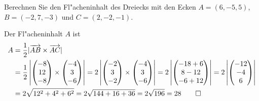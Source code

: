 Berechnen Sie den Fl"acheninhalt des Dreiecks mit den Ecken $A=(6,-5,5)$,
$B=(-2,7,-3)$ und $C=(2,-2,-1)$.

\begin{loesung}
Der Fl"acheninhalt $A$ ist
\begin{align*}
A&=\frac12|\overrightarrow{AB}\times\overrightarrow{AC}|\\
&=
\frac12\left|
\begin{pmatrix}-8\\12\\-8\end{pmatrix}
\times
\begin{pmatrix}-4\\3\\-6\end{pmatrix}
\right|
=
2\left|
\begin{pmatrix}-2\\3\\-2\end{pmatrix}
\times
\begin{pmatrix}-4\\3\\-6\end{pmatrix}
\right|
=
2\left|
\begin{pmatrix}
-18+6\\8-12\\-6+12
\end{pmatrix}
\right|
=
2\left|
\begin{pmatrix}
-12\\-4\\6
\end{pmatrix}
\right|
\\
&=
2\sqrt{12^2+4^2+6^2}
=
2\sqrt{144+16+36}=2\sqrt{196}=28
\qedhere
\end{align*}
\end{loesung}

